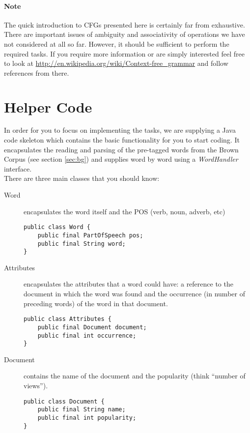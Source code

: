 \documentclass[11pt]{article}
\begin{document}
\paragraph{Note} The quick introduction to CFGs presented here is certainly far from exhaustive. There are important issues of ambiguity and associativity of operations we have not considered at all so far. However, it should be sufficient to perform the required tasks. If you require more information or are simply interested feel free to look at \url{http://en.wikipedia.org/wiki/Context-free_grammar} and follow references from there.

\section{Helper Code}
In order for you to focus on implementing the tasks, we are supplying a Java code skeleton which contains the basic functionality for you to start coding. It encapsulates the reading and parsing of the pre-tagged words from the Brown Corpus (see section \ref{sec:bg}) and supplies word by word using a \textit{WordHandler} interface.\\

There are three main classes that you should know:
\begin{description}
\item[Word] encapsulates the word itself and the POS (verb, noun, adverb, etc)

\begin{lstlisting}
public class Word {
    public final PartOfSpeech pos;
    public final String word;
}
\end{lstlisting}

\item[Attributes] encapsulates the attributes that a word could have: a reference to the document in which the word was found and the occurrence (in number of preceding words) of the word in that document.
\begin{lstlisting}
public class Attributes {
    public final Document document;
    public final int occurrence;
}
\end{lstlisting}
\item[Document] contains the name of the document and the popularity (think ``number of views'').
\begin{lstlisting}
public class Document {
    public final String name;
    public final int popularity;
}
\end{lstlisting}
\end{description}
\end{document}
